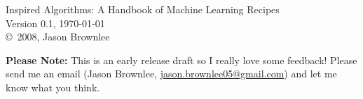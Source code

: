 
\blanknonumber


\begin{flushleft}
%
Inspired Algorithms: A Handbook of Machine Learning Recipes \\
Version 0.1, \today \\
\copyright\ 2008, Jason Brownlee \\
%
\end{flushleft}

\hfill

{\textbf{\color{red}Please Note:} This is an early release draft so I really love some feedback! Please send me an email (Jason Brownlee, \url{jason.brownlee05@gmail.com}) and let me know what you think.}

	
\vfill\vfill\vfill